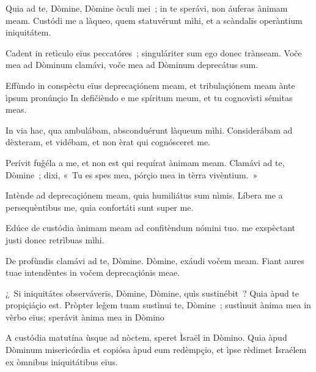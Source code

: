 \prayerVersicleResponse
{Quia ad te, Dòmine, Dòmine òculi mei~; in te sperávi, non áuferas ànimam meam.}
{Custódi me a làqueo, quem statuvérunt mìhi, et a scàndalīs operàntium iniquitátem.}
\vfill

\prayerVersicleResponse
{Cadent in retìculo eïus peccatóres~; singuláriter sum ego donec trànseam.}
{Voče mea ad Dòminum clamávi, voče mea ad Dòminum deprecátus sum.}
\vfill

\prayerVersicleResponse
{Effùndo in conspèctu eïus deprecaçiónem meam, et tribulaçiónem meam ànte ìpsum pronúnçio}
{In defičièndo e me spíritum meum, et tu cognovìsti sémitas meas.}
\vfill

\prayerVersicleResponse
{In via hac, qua ambulábam, absconduérunt làqueum mìhi.}
{Considerábam ad dèxteram, et vidébam, et non èrat qui cognósceret me.}

\prayerVersicleResponse
{Perívit fuǧéla a me, et non est qui requírat ànimam meam.}
{Clamávi ad te, Dòmine~; dixi, «~Tu es spes mea, pórçio mea in tèrra vivèntium.~»}
\vfill

\prayerVersicleResponse
{Intènde ad deprecaçiónem meam, quia humiliátus sum nìmis.}
{Líbera me a persequèntibus me, quia confortáti sunt super me.}
\vfill

\vfill

\prayerVersicleResponse
{Edúce de custódia ànimam meam ad confitèndum nómini tuo.}
{me exspèctant justi donec retrìbuas mìhi.}
\vfill

\vfill

\prayerVersicleResponse
{De profùndīs clamávi ad te, Dòmine. Dòmine, exáudi vočem meam.}
{Fiant aures tuae intendèntes in vočem deprecaçiónis meae.}

\newpage


\prayerVersicleResponse
{¿~Si iniquitátes observáverīs, Dòmine, Dòmine, quìs sustinébit~? Quia àpud te propiçiáçio est.}
{Pròpter leǧem tuam sustìnui te, Dòmine~; sustìnuit ànima mea in vèrbo eïus; sperávit ànima mea in Dòmino}


\prayerVersicleResponse
{A custódia matutína ùsque ad nòctem, speret Ìsraël in Dòmino.}
{Quia àpud Dòminum misericórdia et copiósa àpud eum redèmpçio, et ìpse rèdimet Israélem ex òmnibus iniquitátibus eïus.}


